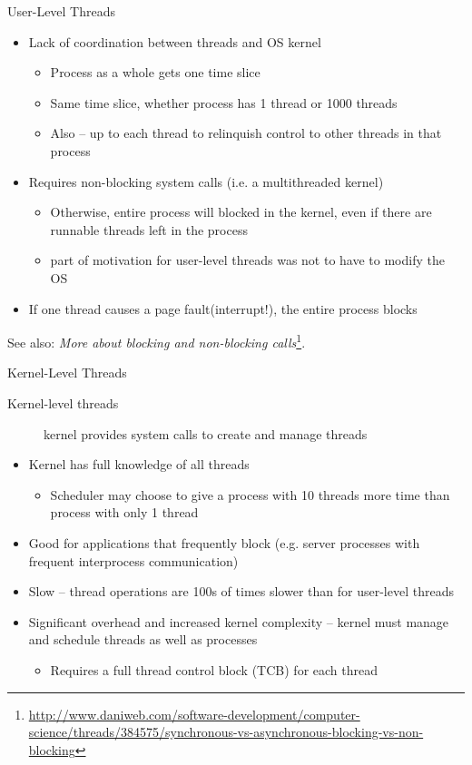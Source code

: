\begin{frame}{User-Level Threads}
  \begin{itemize}
  \item[\alert{\bad}]  Lack of coordination between threads and OS kernel
    \begin{itemize}
    \item Process as a whole gets one time slice
    \item Same time slice, whether process has 1 thread or 1000 threads
    \item Also -- up to each thread to relinquish control to other threads in that process
    \end{itemize}
  \item[\alert{\bad}] Requires non-blocking system calls (i.e. a multithreaded kernel)
    \begin{itemize}
    \item Otherwise, entire process will blocked in the kernel, even if there are runnable threads
      left in the process
    \item part of motivation for user-level threads was not to have to modify the OS
    \end{itemize}
  \item[\alert{\bad}] If one thread causes a page fault(interrupt!), the entire process
    blocks
  \end{itemize}
\end{frame}

See also: \emph{More about blocking and non-blocking calls}\footnote{\url{http://www.daniweb.com/software-development/computer-science/threads/384575/synchronous-vs-asynchronous-blocking-vs-non-blocking}}.

\begin{frame}{Kernel-Level Threads}
  \begin{description}
  \item[Kernel-level threads] kernel provides system calls to create and manage threads
  \end{description}
  \begin{itemize}
  \item[\good] Kernel has full knowledge of all threads
    \begin{itemize}
    \item Scheduler may choose to give a process with 10 threads more time than process with only 1
      thread
    \end{itemize}
  \item[\good] Good for applications that frequently block (e.g. server processes with
    frequent interprocess communication)
  \item[\alert{\bad}] Slow -- thread operations are 100s of times slower than for
    user-level threads
  \item[\alert{\bad}] Significant overhead and increased kernel complexity -- kernel must
    manage and schedule threads as well as processes
    \begin{itemize}
    \item Requires a full thread control block (TCB) for each thread
    \end{itemize}
  \end{itemize}
\end{frame}

